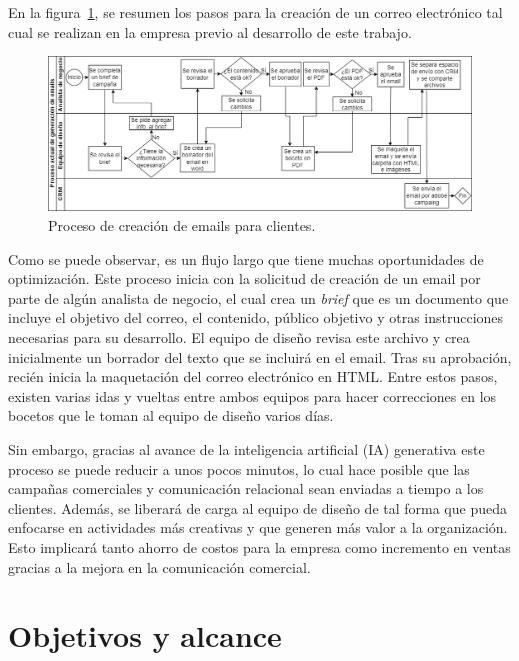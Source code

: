 En la figura~\ref{fig:procesoEmail}, se resumen los pasos para la creación de un correo electrónico tal cual se realizan en la empresa previo al desarrollo de este trabajo. 

\begin{landscape}
\begin{figure}[htbp]
\centering
\includegraphics[width=\linewidth]{./Figures/Diagrama1_Creacion_Emails.png}
\caption{Proceso de creación de emails para clientes.}
\label{fig:procesoEmail}
\end{figure}
\end{landscape}

Como se puede observar, es un flujo largo que tiene muchas oportunidades de optimización. Este proceso inicia con la solicitud de creación de un email por parte de algún analista de negocio, el cual crea un \textit{brief} que es un documento que incluye el objetivo del correo, el contenido, público objetivo y otras instrucciones necesarias para su desarrollo. El equipo de diseño revisa este archivo y crea inicialmente un borrador del texto que se incluirá en el email. Tras su aprobación, recién inicia la maquetación del correo electrónico en HTML. Entre estos pasos, existen varias idas y vueltas entre ambos equipos para hacer correcciones en los bocetos que le toman al equipo de diseño varios días.

Sin embargo, gracias al avance de la inteligencia artificial (IA) generativa este proceso se puede reducir a unos pocos minutos, lo cual hace posible que las campañas comerciales y comunicación relacional sean enviadas a tiempo a los clientes. Además, se liberará de carga al equipo de diseño de tal forma que pueda enfocarse en actividades más creativas y que generen más valor a la organización. Esto implicará tanto ahorro de costos para la empresa como incremento en ventas gracias a la mejora en la comunicación comercial.


\section{Objetivos y alcance}

